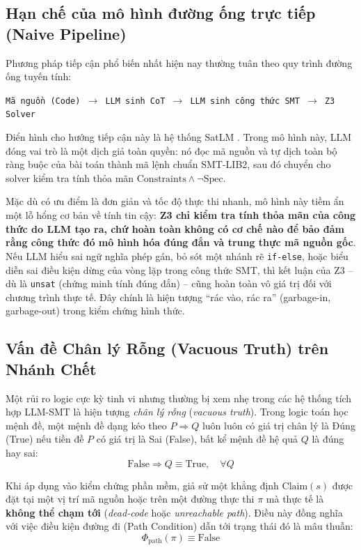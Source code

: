 \subsection{Hạn chế của mô hình đường ống trực tiếp (Naive Pipeline)}
Phương pháp tiếp cận phổ biến nhất hiện nay thường tuân theo quy trình đường ống tuyến tính: 
\begin{center}
\texttt{Mã nguồn (Code) $\rightarrow$ LLM sinh CoT $\rightarrow$ LLM sinh công thức SMT $\rightarrow$ Z3 Solver}
\end{center}
Điển hình cho hướng tiếp cận này là hệ thống SatLM \cite{ye2023satlm}. Trong mô hình này, LLM đóng vai trò là một dịch giả toàn quyền: nó đọc mã nguồn và tự dịch toàn bộ ràng buộc của bài toán thành mã lệnh chuẩn SMT-LIB2, sau đó chuyển cho solver kiểm tra tính thỏa mãn $\text{Constraints} \land \neg \text{Spec}$. 

Mặc dù có ưu điểm là đơn giản và tốc độ thực thi nhanh, mô hình này tiềm ẩn một lỗ hổng cơ bản về tính tin cậy: \textbf{Z3 chỉ kiểm tra tính thỏa mãn của công thức do LLM tạo ra, chứ hoàn toàn không có cơ chế nào để bảo đảm rằng công thức đó mô hình hóa đúng đắn và trung thực mã nguồn gốc}. Nếu LLM hiểu sai ngữ nghĩa phép gán, bỏ sót một nhánh rẽ \texttt{if-else}, hoặc biểu diễn sai điều kiện dừng của vòng lặp trong công thức SMT, thì kết luận của Z3 -- dù là \texttt{unsat} (chứng minh tính đúng đắn) -- cũng hoàn toàn vô giá trị đối với chương trình thực tế. Đây chính là hiện tượng ``rác vào, rác ra'' (garbage-in, garbage-out) trong kiểm chứng hình thức.

\subsection{Vấn đề Chân lý Rỗng (Vacuous Truth) trên Nhánh Chết}
Một rủi ro logic cực kỳ tinh vi nhưng thường bị xem nhẹ trong các hệ thống tích hợp LLM-SMT là hiện tượng \textit{chân lý rỗng} (\textit{vacuous truth}). Trong logic toán học mệnh đề, một mệnh đề dạng kéo theo $P \Rightarrow Q$ luôn luôn có giá trị chân lý là Đúng (True) nếu tiền đề $P$ có giá trị là Sai (False), bất kể mệnh đề hệ quả $Q$ là đúng hay sai:
\begin{equation}
\label{eq:vacuous_truth}
\text{False} \Rightarrow Q \equiv \text{True}, \quad \forall Q
\end{equation}

Khi áp dụng vào kiểm chứng phần mềm, giả sử một khẳng định $\text{Claim}(s)$ được đặt tại một vị trí mã nguồn hoặc trên một đường thực thi $\pi$ mà thực tế là \textbf{không thể chạm tới} (\textit{dead-code} hoặc \textit{unreachable path}). Điều này đồng nghĩa với việc điều kiện đường đi (Path Condition) dẫn tới trạng thái đó là mâu thuẫn:
\begin{equation}
\Phi_{\text{path}}(\pi) \equiv \text{False}
\end{equation}

